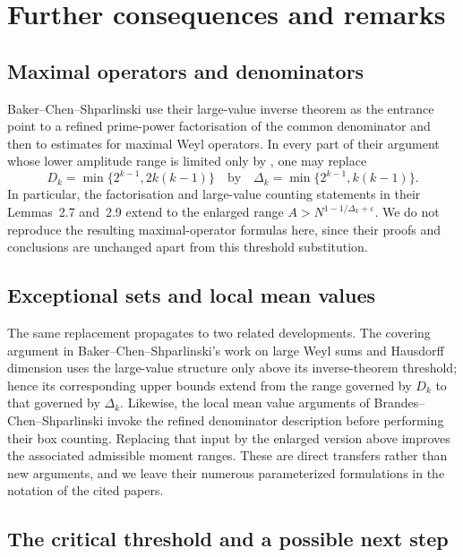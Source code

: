 \documentclass[11pt,reqno]{amsart}
\numberwithin{equation}{section}
\theoremstyle{definition}
\theoremstyle{remark}
\begin{document}
\section{Further consequences and remarks}\label{sec:further-consequences}

\subsection{Maximal operators and denominators}

Baker--Chen--Shparlinski \cite{BakerChenShparlinski2024} use their large-value inverse theorem as the entrance point to a refined prime-power factorisation of the common denominator and then to estimates for maximal Weyl operators.  In every part of their argument whose lower amplitude range is limited only by \cite[Lemma~2.6]{BakerChenShparlinski2024}, one may replace
\[
  D_k=\min\{2^{k-1},2k(k-1)\}
  \quad\text{by}\quad
  \Delta_k=\min\{2^{k-1},k(k-1)\}.
\]
In particular, the factorisation and large-value counting statements in their Lemmas~2.7 and~2.9 extend to the enlarged range
$A>N^{1-1/\Delta_k+\varepsilon}$.  We do not reproduce the resulting maximal-operator formulas here, since their proofs and conclusions are unchanged apart from this threshold substitution.

\subsection{Exceptional sets and local mean values}

The same replacement propagates to two related developments.  The covering argument in Baker--Chen--Shparlinski's work on large Weyl sums and Hausdorff dimension \cite{BakerChenShparlinskiHausdorff2022} uses the large-value structure only above its inverse-theorem threshold; hence its corresponding upper bounds extend from the range governed by $D_k$ to that governed by $\Delta_k$.  Likewise, the local mean value arguments of Brandes--Chen--Shparlinski \cite{BrandesChenShparlinski2024} invoke the refined denominator description before performing their box counting.  Replacing that input by the enlarged version above improves the associated admissible moment ranges.  These are direct transfers rather than new arguments, and we leave their numerous parameterized formulations in the notation of the cited papers.

\subsection{The critical threshold and a possible next step}
\end{document}
